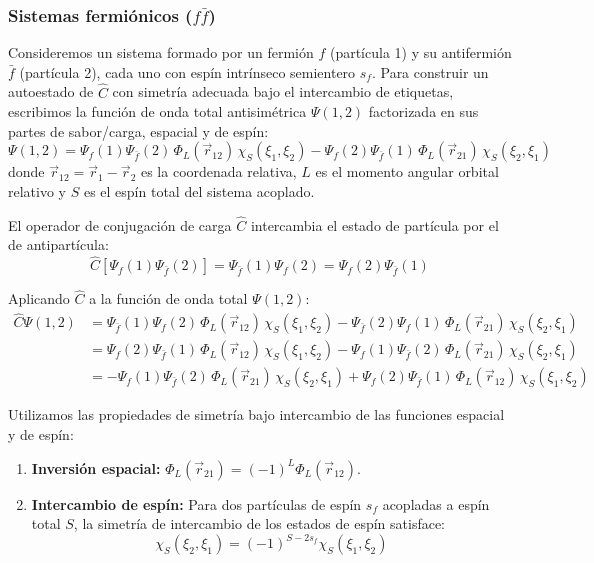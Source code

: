 \subsubsection{Sistemas fermiónicos ($f\bar{f}$)}

Consideremos un sistema formado por un fermión $f$ (partícula 1) y su antifermión $\bar{f}$ (partícula 2), cada uno con espín intrínseco semientero $s_f$. Para construir un autoestado de $\hat{C}$ con simetría adecuada bajo el intercambio de etiquetas, escribimos la función de onda total antisimétrica $\Psi(1,2)$ factorizada en sus partes de sabor/carga, espacial y de espín:
\begin{equation}
    \Psi(1,2) = \Psi_f(1)\Psi_{\bar{f}}(2) \, \Phi_L(\vec{r}_{12}) \, \chi_S(\xi_1,\xi_2) - \Psi_f(2)\Psi_{\bar{f}}(1) \, \Phi_L(\vec{r}_{21}) \, \chi_S(\xi_2,\xi_1)
\end{equation}
donde $\vec{r}_{12} = \vec{r}_1 - \vec{r}_2$ es la coordenada relativa, $L$ es el momento angular orbital relativo y $S$ es el espín total del sistema acoplado.

El operador de conjugación de carga $\hat{C}$ intercambia el estado de partícula por el de antipartícula:
\begin{equation}
    \hat{C} \left[ \Psi_f(1) \Psi_{\bar{f}}(2) \right] = \Psi_{\bar{f}}(1) \Psi_f(2) = \Psi_f(2) \Psi_{\bar{f}}(1)
\end{equation}

Aplicando $\hat{C}$ a la función de onda total $\Psi(1,2)$:
\begin{align}
    \hat{C}\Psi(1,2) &= \Psi_{\bar{f}}(1)\Psi_f(2) \, \Phi_L(\vec{r}_{12}) \, \chi_S(\xi_1,\xi_2) - \Psi_{\bar{f}}(2)\Psi_f(1) \, \Phi_L(\vec{r}_{21}) \, \chi_S(\xi_2,\xi_1) \nonumber \\
    &= \Psi_f(2)\Psi_{\bar{f}}(1) \, \Phi_L(\vec{r}_{12}) \, \chi_S(\xi_1,\xi_2) - \Psi_f(1)\Psi_{\bar{f}}(2) \, \Phi_L(\vec{r}_{21}) \, \chi_S(\xi_2,\xi_1) \nonumber \\
    &= -\Psi_f(1)\Psi_{\bar{f}}(2) \, \Phi_L(\vec{r}_{21}) \, \chi_S(\xi_2,\xi_1) + \Psi_f(2)\Psi_{\bar{f}}(1) \, \Phi_L(\vec{r}_{12}) \, \chi_S(\xi_1,\xi_2)
\end{align}

Utilizamos las propiedades de simetría bajo intercambio de las funciones espacial y de espín:
\begin{enumerate}
    \item \textbf{Inversión espacial:} $\Phi_L(\vec{r}_{21}) = (-1)^L \Phi_L(\vec{r}_{12})$.
    \item \textbf{Intercambio de espín:} Para dos partículas de espín $s_f$ acopladas a espín total $S$, la simetría de intercambio de los estados de espín satisface:
    \begin{equation}
        \chi_S(\xi_2,\xi_1) = (-1)^{S - 2s_f} \chi_S(\xi_1,\xi_2)
    \end{equation}
\end{enumerate}

